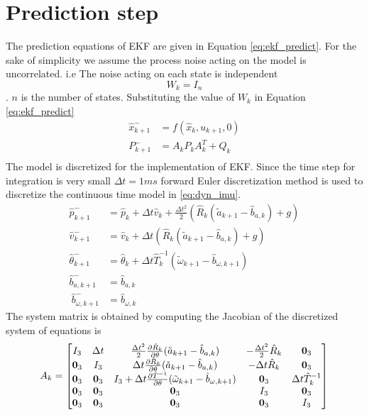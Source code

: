 \section{Prediction step}
The prediction equations of EKF are given in Equation \ref{eq:ekf_predict}. For the sake of simplicity we assume the process noise acting on the model is uncorrelated. i.e The noise acting on each state is independent $$W_k = I_n$$. $n$ is the number of states. Substituting the value of $W_k$ in Equation \ref{eq:ekf_predict}
\begin{equation}
\label{eq:imu_predict}
\begin{split}
\hat{x}_{k+1}^- &= f(\hat{x}_{k},u_{k+1},0)\\
P_{k+1}^- &= A_kP_{k}A_k^T + Q_{k}\\
\end{split}
\end{equation}
The model is discretized for the implementation of EKF. Since the time step for integration is very small $\Delta t = 1ms$ forward Euler discretization method is used to discretize the continuous time model in \ref{eq:dyn_imu}.
\begin{equation}
    \label{eq:dyn_imu_disc}
    \begin{split}
    \hat{p}_{k+1}^- &= \hat{p}_k + \Delta t \hat{v}_k + \frac{\Delta t^2}{2} (\hat{R}_k (\tilde{a}_{k+1} - \hat{b}_{a,k})+g) \\
    \hat{v}_{k+1}^- &= \hat{v}_k + \Delta t (\hat{R}_k (\tilde{a}_{k+1} - \hat{b}_{a,k})+g) \\
    \hat{\theta}_{k+1}^- &= \hat{\theta}_k + \Delta t \hat{T}_k^{-1}(\tilde{\omega}_{k+1} - \hat{b}_{\omega,k+1}) \\
    \hat{b}_{a,k+1}^- &= \hat{b}_{a,k}\\\
    \hat{b}_{\omega,k+1}^- &= \hat{b}_{\omega,k}
    \end{split}
\end{equation}
The system matrix is obtained by computing the Jacobian of the discretized system of equations is
\begin{equation}
    A_k = \begin{bmatrix}
    I_3 &\Delta t &\frac{\Delta t^2}{2} \frac{\partial {\hat{R}_k}}{\partial {\theta}}(\tilde{a}_{k+1} - \hat{b}_{a,k} ) &-\frac{\Delta t^2}{2} \hat{R}_k &\textbf{0}_3 \\
    \textbf{0}_3 &I_3  &\Delta t \frac{\partial {\hat{R}_k}}{\partial {\theta}}(\tilde{a}_{k+1} - \hat{b}_{a,k} ) &-\Delta t\hat{R}_k &\textbf{0}_3\\
    \textbf{0}_3  &\textbf{0}_3 &I_3 + \Delta t \frac{\partial {\hat{T}^{-1}}}{\partial {\theta}}(\tilde{\omega}_{k+1} - \hat{b}_{\omega,k+1}) &\textbf{0}_3 &\Delta t \hat{T}_k^{-1}\\
    \textbf{0}_3  &\textbf{0}_3  &\textbf{0}_3  &I_3 &\textbf{0}_3 \\
    \textbf{0}_3  &\textbf{0}_3  &\textbf{0}_3  &\textbf{0}_3 &I_3
    \end{bmatrix}
\end{equation}

